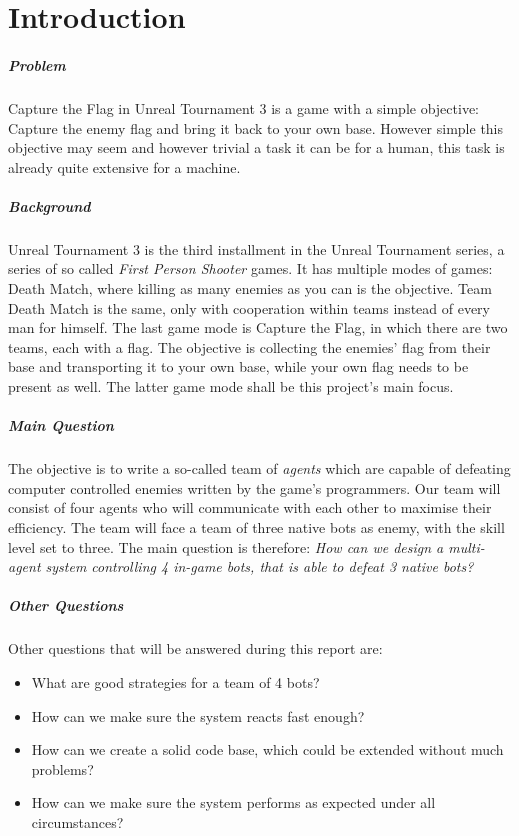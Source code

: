 \chapter{Introduction}

\paragraph{Problem}
Capture the Flag in Unreal Tournament 3 is a game with a simple objective: Capture the enemy flag and bring it back to your own base. However simple this objective may seem and however trivial a task it can be for a human, this task is already quite extensive for a machine.

\paragraph{Background}
Unreal Tournament 3 is the third installment in the Unreal Tournament series, a series of so called \emph{First Person Shooter} games. It has multiple modes of games: Death Match, where killing as many enemies as you can is the objective. Team Death Match is the same, only with cooperation within teams instead of every man for himself. The last game mode is Capture the Flag, in which there are two teams, each with a flag. The objective is collecting the enemies' flag from their base and transporting it to your own base, while your own flag needs to be present as well. The latter game mode shall be this project's main focus.

\paragraph{Main Question}
The objective is to write a so-called team of \emph{agents} which are capable of defeating computer controlled enemies written by the game's programmers. Our team will consist of four agents who will communicate with each other to maximise their efficiency. The team will face a team of three native bots as enemy, with the skill level set to three. The main question is therefore: \emph{How can we design a multi-agent system controlling 4 in-game bots, that is able to defeat 3 native bots?}

\paragraph{Other Questions}
Other questions that will be answered during this report are:
\begin{itemize}
	\item What are good strategies for a team of 4 bots? 
	\item How can we make sure the system reacts fast enough? 
	\item How can we create a solid code base, which could be extended without much problems? 
	\item How can we make sure the system performs as expected under all circumstances? 
\end{itemize}

